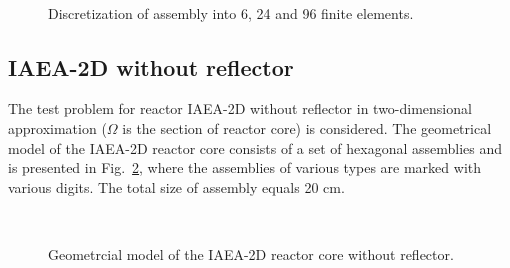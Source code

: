 \documentclass[authoryear]{elsarticle}
\begin{document}
\begin{figure}[h]
\begin{minipage}{0.30\linewidth}
	\end{minipage}
	\hfill
	\begin{minipage}{0.30\linewidth}
		\\
	\end{minipage}
	\caption{Discretization of assembly into 6, 24 and 96 finite elements.}
	\label{fig:mesh}
\end{figure}

\subsection{IAEA-2D without reflector}
The test problem for reactor IAEA-2D without reflector \citep{chao1995} in two-dimensional approximation ($\Omega$ is the section of reactor core) is considered.
The geometrical model of the IAEA-2D reactor core consists of a set of hexagonal assemblies and is presented in Fig.~\ref{fig:iaea}, where the assemblies of various types are marked with various digits. 
The total size of assembly equals 20 cm. 

\begin{figure}[h]
	\\
	\caption{Geometrcial model of the IAEA-2D reactor core without reflector.}
	\label{fig:iaea}
\end{figure}
\end{document}
